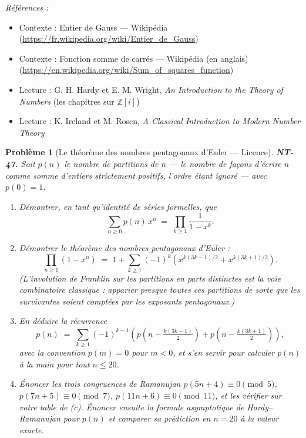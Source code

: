 \documentclass[11pt]{article}
\newtheorem{problem}{Problème}
\newenvironment{refs}{\par\small\noindent\emph{Références :}\begin{itemize}\setlength\itemsep{0pt}}{\end{itemize}\normalsize}
\begin{document}
\begin{refs}
\item Contexte : Entier de Gauss --- Wikipédia (\url{https://fr.wikipedia.org/wiki/Entier_de_Gauss})
\item Contexte : Fonction somme de carrés --- Wikipédia (en anglais) (\url{https://en.wikipedia.org/wiki/Sum_of_squares_function})
\item Lecture : G. H. Hardy et E. M. Wright, \textit{An Introduction to the Theory of Numbers} (les chapitres sur $ \mathbb{Z}[i] $)
\item Lecture : K. Ireland et M. Rosen, \textit{A Classical Introduction to Modern Number Theory}
\end{refs}

\bigskip

\begin{problem}[{Le théorème des nombres pentagonaux d'Euler --- Licence}]
\textbf{NT-47.} Soit $ p(n) $ le nombre de partitions de $ n $ --- le nombre de façons
d'écrire $ n $ comme somme d'entiers strictement positifs, l'ordre étant ignoré --- avec
$ p(0) = 1 $.
\begin{enumerate}
\item[(a)] Démontrer, en tant qu'identité de séries formelles, que
\[ \sum_{n \ge 0} p(n)\, x^n \;=\; \prod_{k \ge 1} \frac{1}{1 - x^k} . \]
\item[(b)] Démontrer le théorème des nombres pentagonaux d'Euler :
\[ \prod_{n \ge 1} (1 - x^n) \;=\; 1 + \sum_{k \ge 1} (-1)^k \left( x^{k(3k-1)/2} + x^{k(3k+1)/2} \right). \]
(L'involution de Franklin sur les partitions en parts distinctes est la voie combinatoire classique :
apparier presque toutes ces partitions de sorte que les survivantes soient comptées par les exposants
pentagonaux.)
\item[(c)] En déduire la récurrence
\[ p(n) \;=\; \sum_{k \ge 1} (-1)^{k-1}\left( p\!\left(n - \tfrac{k(3k-1)}{2}\right) + p\!\left(n - \tfrac{k(3k+1)}{2}\right) \right), \]
avec la convention $ p(m) = 0 $ pour $ m < 0 $, et s'en servir pour calculer $ p(n) $ à la
main pour tout $ n \le 20 $.
\item[(d)] Énoncer les trois congruences de Ramanujan $ p(5n+4) \equiv 0 \pmod 5 $,
$ p(7n+5) \equiv 0 \pmod 7 $, $ p(11n+6) \equiv 0 \pmod{11} $, et les vérifier sur votre table
de (c). Énoncer ensuite la formule asymptotique de Hardy--Ramanujan pour $ p(n) $ et comparer
sa prédiction en $ n = 20 $ à la valeur exacte.
\end{enumerate}

\end{problem}
\end{document}

